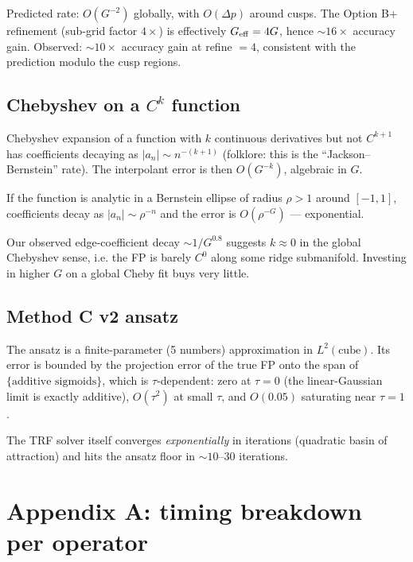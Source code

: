 \documentclass[11pt]{article}
\begin{document}
Predicted rate: $O(G^{-2})$ globally, with $O(\Delta p)$ around cusps.
The Option B+ refinement (sub-grid factor $4{\times}$) is effectively
$G_{\rm eff} = 4G$, hence $\sim 16{\times}$ accuracy gain. Observed:
$\sim 10{\times}$ accuracy gain at refine $= 4$, consistent with the
prediction modulo the cusp regions.

\subsection{Chebyshev on a $C^k$ function}

Chebyshev expansion of a function with $k$ continuous derivatives but
not $C^{k+1}$ has coefficients decaying as $|a_n| \sim n^{-(k+1)}$
(folklore: this is the ``Jackson--Bernstein'' rate). The interpolant
error is then $O(G^{-k})$, algebraic in $G$.

If the function is analytic in a Bernstein ellipse of radius $\rho > 1$
around $[-1, 1]$, coefficients decay as $|a_n| \sim \rho^{-n}$ and
the error is $O(\rho^{-G})$ --- exponential.

Our observed edge-coefficient decay $\sim 1/G^{0.8}$ suggests $k \approx 0$
in the global Chebyshev sense, i.e. the FP is barely $C^0$ along
some ridge submanifold. Investing in higher $G$ on a global Cheby fit
buys very little.

\subsection{Method C v2 ansatz}

The ansatz is a finite-parameter (5 numbers) approximation in
$L^2(\text{cube})$. Its error is bounded by the projection error of
the true FP onto the span of $\{\text{additive sigmoids}\}$, which is
$\tau$-dependent: zero at $\tau = 0$ (the linear-Gaussian limit is
exactly additive), $O(\tau^2)$ at small $\tau$, and $O(0.05)$ saturating
near $\tau = 1$.

The TRF solver itself converges \emph{exponentially} in iterations
(quadratic basin of attraction) and hits the ansatz floor in
$\sim 10$--$30$ iterations.

\section{Appendix A: timing breakdown per operator}
\end{document}

